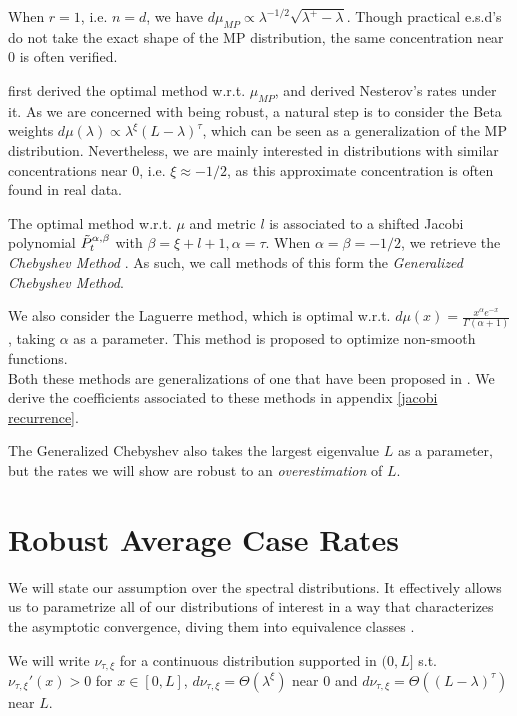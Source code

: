 \documentclass{article}
\begin{document}
When $r=1$, i.e. $n=d$, we have $d\mu_{MP}\propto \lambda^{-1/2}\sqrt{\lambda^+-\lambda}$. Though practical e.s.d's do not take the exact shape of the MP distribution, the same concentration near $0$ is often verified.


\cite{pedregosa2020acceleration} first derived the optimal method w.r.t. $\mu_{MP}$, and \cite{paquette2020halting} derived Nesterov's rates under it. As we are concerned with being robust, a natural step is to consider the Beta weights $d\mu(\lambda)\propto\lambda^\xi(L-\lambda)^\tau$, which can be seen as a generalization of the MP distribution.  Nevertheless, we are mainly interested in distributions with similar concentrations near $0$, i.e. $\xi\approx -1/2$, as this approximate concentration is often found in real data.


The optimal method w.r.t. $\mu$ and metric $l$ is associated to a shifted Jacobi polynomial $\Tilde{P}_t^{\alpha,\beta}$ with $\beta=\xi+l+1, \alpha=\tau$. When $\alpha=\beta=-1/2$, we retrieve the \textit{Chebyshev Method} \citep{hestenes1952methods}. As such, we call methods of this form the \textit{Generalized Chebyshev Method}. 


We  also consider the Laguerre method, which is optimal w.r.t. $d\mu(x)=\frac{x^\alpha e^{-x}}{\Gamma(\alpha+1)}$, taking $\alpha$ as a parameter. This method is proposed to optimize non-smooth functions.\\
Both these methods are generalizations of one that have been proposed in \cite{pedregosa2020acceleration}. We derive the coefficients associated to these methods in appendix \ref{jacobi recurrence}.\\
\begin{remark}
The Generalized Chebyshev also takes the largest eigenvalue $L$ as a parameter, but the rates we will show are robust to an \textit{overestimation} of $L$.
\end{remark}

\section{Robust Average Case Rates} \label{section: robust average}
We will state our assumption over the spectral distributions. It effectively allows us to parametrize all of our distributions of interest in a way that characterizes the asymptotic convergence, diving them into equivalence classes .

\begin{assumption}
We will write $\nu_{\tau,\xi}$ for a continuous distribution supported in $(0,L]$ s.t. $\nu_{\tau,\xi}'(x)>0$ for $x\in [0,L]$, $d\nu_{\tau,\xi}=\Theta( \lambda^\xi)$ near $0$ and $d\nu_{\tau,\xi}=\Theta( (L-\lambda)^\tau)$ near $L$. 
\label{assumption}
\end{assumption}
\end{document}

